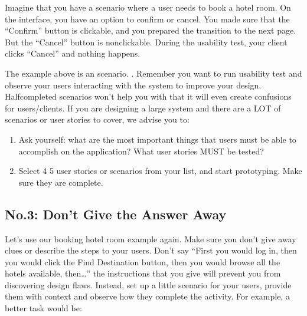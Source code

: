 \documentclass[letterpaper,10pt,english]{jupyterBook}
\begin{document}
\sphinxAtStartPar
Imagine that you have a scenario where a user needs to book a hotel room.  On the interface, you have an option to
confirm or cancel. You made sure that the “Confirm” button is clickable, and you prepared the transition to the
next page.  But the “Cancel” button is non\sphinxhyphen{}clickable. During the usability test, your client clicks “Cancel”
and nothing happens.

\sphinxAtStartPar
The example above is an  scenario. .  Remember \sphinxhyphen{} you want to run usability test and observe your users
interacting with the system to improve your design. Half\sphinxhyphen{}completed scenarios won’t help you with that \sphinxhyphen{} it will even
create confusions for users/clients. If you are designing a large system and there are a LOT of scenarios or user
stories to cover, we advise you to:
\begin{enumerate}
%
\item {} 
\sphinxAtStartPar
Ask yourself: what are the most important things that users must be able to accomplish on the application?
What user stories MUST be tested?

\item {} 
\sphinxAtStartPar
Select 4 \sphinxhyphen{} 5 user stories or scenarios from your list, and start prototyping. Make sure they are complete.

\end{enumerate}


\subsection{No.3: Don’t Give the Answer Away}
\label{\detokenize{appendices/appendix_e/figma_guide:no-3-don-t-give-the-answer-away}}
\sphinxAtStartPar
Let’s use our booking hotel room example again. Make sure you don’t give away clues or describe the steps to your
users. Don’t say “First you would log in, then you would click the Find Destination button, then you would browse
all the hotels available, then…” the instructions that you give will prevent you from discovering design flaws.
Instead, set up a little scenario for your users, provide them with context and observe how they complete the
activity. For example, a better task would be:

\sphinxAtStartPar
{}
\end{document}
